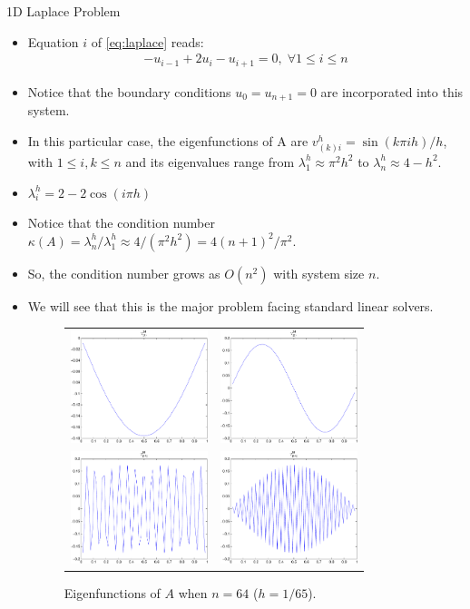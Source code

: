 \documentclass{beamer}
\begin{document}
\begin{frame}[allowframebreaks]{1D Laplace Problem}
\begin{itemize}
  \item Equation $i$ of \eqref{eq:laplace} reads:
  \begin{align}
   -u_{i-1}+2u_i-u_{i+1} = 0, \; \forall 1 \leq i \leq n
  \end{align}
  \item Notice that the boundary conditions $u_0 = u_{n+1} = 0$ are incorporated
        into this system.
  \item In this particular case, the eigenfunctions of A are $v^h_{(k)i} = \sin(k \pi ih)/h$,
        with $1 \leq i,k \leq n$ and its eigenvalues range from $\lambda_1^h \approx \pi^2 h^2$ to
        $\lambda_n^h \approx 4-h^2$.
  \item $\lambda_i^h = 2-2\cos( i\pi h )$
  \item Notice that the condition number
        $\kappa(A) = \lambda_n^h / \lambda_1^h \approx 4/(\pi^2h^2) = 4(n+1)^2/\pi^2$.
  \item So, the condition number grows as $O(n^2)$ with system size $n$.
  \item We will see that this is the major problem facing standard linear solvers.
  \begin{figure}
   \begin{tabular}{cc}
    \includegraphics[width=4cm]{images/v64_1.pdf} & \includegraphics[width=4cm]{images/v64_2.pdf} \\
    \includegraphics[width=4cm]{images/v64_31.pdf} & \includegraphics[width=4cm]{images/v64_64.pdf}
   \end{tabular}
   \caption{Eigenfunctions of $A$ when $n=64$ ($h=1/65$).}
  \end{figure}
 \end{itemize}
\end{frame}
\end{document}
